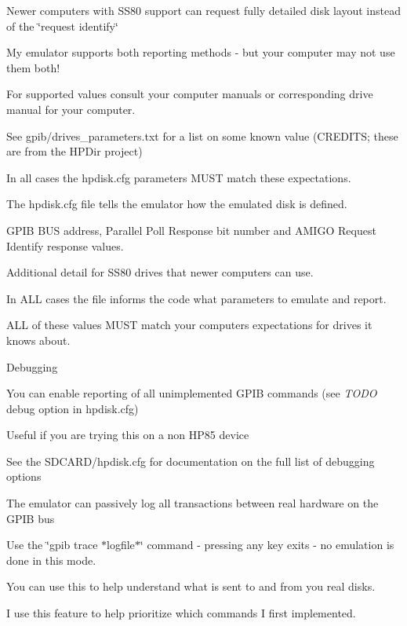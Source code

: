 \begin{DoxyItemize}
\begin{DoxyItemize}
\begin{DoxyItemize}
\end{DoxyItemize}
\item Newer computers with S\+S80 support can request fully detailed disk layout instead of the \char`\"{}request identify\char`\"{}
\item My emulator supports both reporting methods -\/ but your computer may not use them both!
\begin{DoxyItemize}
\item For supported values consult your computer manuals or corresponding drive manual for your computer.
\begin{DoxyItemize}
\item See gpib/drives\+\_\+parameters.\+txt for a list on some known value (C\+R\+E\+D\+I\+TS; these are from the H\+P\+Dir project)
\end{DoxyItemize}
\item In all cases the hpdisk.\+cfg parameters M\+U\+ST match these expectations.
\end{DoxyItemize}
\item The hpdisk.\+cfg file tells the emulator how the emulated disk is defined.
\begin{DoxyItemize}
\item G\+P\+IB B\+US address, Parallel Poll Response bit number and A\+M\+I\+GO Request Identify response values.
\item Additional detail for S\+S80 drives that newer computers can use.
\item In A\+LL cases the file informs the code what parameters to emulate and report.
\begin{DoxyItemize}
\item A\+LL of these values M\+U\+ST match your computers expectations for drives it knows about.
\end{DoxyItemize}
\end{DoxyItemize}
\item Debugging
\begin{DoxyItemize}
\item You can enable reporting of all unimplemented G\+P\+IB commands (see {\itshape T\+O\+DO} debug option in hpdisk.\+cfg)
\begin{DoxyItemize}
\item Useful if you are trying this on a non H\+P85 device
\item See the S\+D\+C\+A\+R\+D/hpdisk.\+cfg for documentation on the full list of debugging options
\end{DoxyItemize}
\item The emulator can passively log all transactions between real hardware on the G\+P\+IB bus
\begin{DoxyItemize}
\item Use the \char`\"{}gpib trace $\ast$logfile$\ast$\char`\"{} command -\/ pressing any key exits -\/ no emulation is done in this mode.
\item You can use this to help understand what is sent to and from you real disks.
\item I use this feature to help prioritize which commands I first implemented. 



\end{DoxyItemize}
\end{DoxyItemize}
\end{DoxyItemize}
\end{DoxyItemize}
